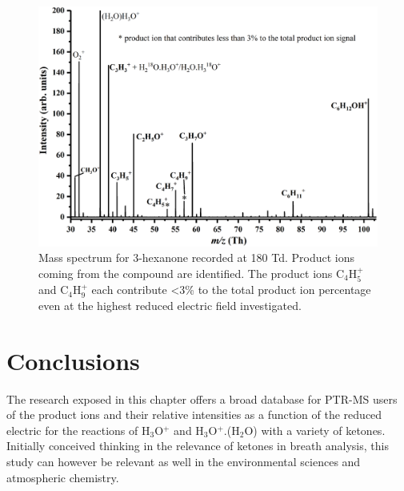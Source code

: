 


\begin{figure}%
\centering
\includegraphics[height=0.35\textheight]{pics/ketones/plot_7.png}
\caption{Mass spectrum for 3-hexanone recorded at 180 Td. Product ions coming from the compound are identified. The product ions C$_4$H$_5^+$ and C$_4$H$_9^+$ each contribute <3\% to the total product ion percentage even at the highest reduced electric field investigated.}
\label{fig:ke_fig3}
\end{figure}






\section{Conclusions}
The research exposed in this chapter offers a broad database for PTR-MS users of the product ions and their relative intensities as a function of the reduced electric for the reactions of H$_3$O$^+$ and H$_3$O$^+$.(H$_2$O) with a variety of ketones.
Initially conceived thinking in the relevance of ketones in breath analysis, this study can however be relevant as well in the environmental sciences and atmospheric chemistry. 



